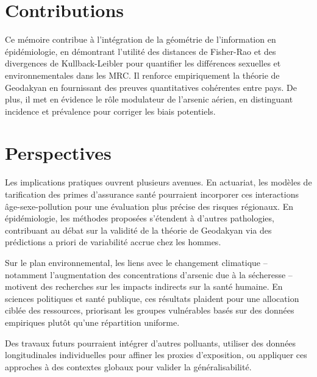 \section{Contributions}

Ce mémoire contribue à l'intégration de la géométrie de l'information en épidémiologie, en démontrant l'utilité des distances de Fisher-Rao et des divergences de Kullback-Leibler pour quantifier les différences sexuelles et environnementales dans les MRC. Il renforce empiriquement la théorie de Geodakyan en fournissant des preuves quantitatives cohérentes entre pays. De plus, il met en évidence le rôle modulateur de l'arsenic aérien, en distinguant incidence et prévalence pour corriger les biais potentiels.

\section{Perspectives}

Les implications pratiques ouvrent plusieurs avenues. En actuariat, les modèles de tarification des primes d'assurance santé pourraient incorporer ces interactions âge-sexe-pollution pour une évaluation plus précise des risques régionaux. En épidémiologie, les méthodes proposées s'étendent à d'autres pathologies, contribuant au débat sur la validité de la théorie de Geodakyan via des prédictions a priori de variabilité accrue chez les hommes.

Sur le plan environnemental, les liens avec le changement climatique – notamment l'augmentation des concentrations d'arsenic due à la sécheresse – motivent des recherches sur les impacts indirects sur la santé humaine. En sciences politiques et santé publique, ces résultats plaident pour une allocation ciblée des ressources, priorisant les groupes vulnérables basés sur des données empiriques plutôt qu'une répartition uniforme.

Des travaux futurs pourraient intégrer d'autres polluants, utiliser des données longitudinales individuelles pour affiner les proxies d'exposition, ou appliquer ces approches à des contextes globaux pour valider la généralisabilité.